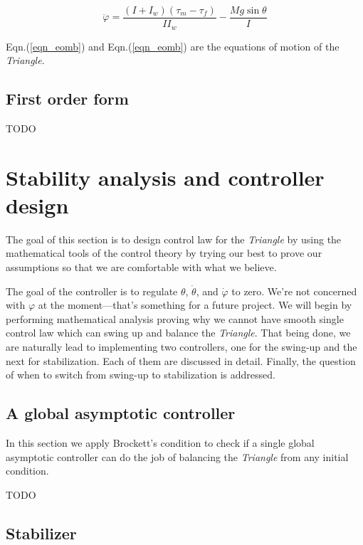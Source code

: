 \documentclass{article}
\begin{document}
\begin{equation}
  \label{eqn_eomw}
  \ddot{\varphi} = \dfrac{(I + I_w)(\tau_m - \tau_f)}{I I_w} - \dfrac{M g \sin\theta}{I}
\end{equation}

Eqn.(\ref{eqn_eomb}) and Eqn.(\ref{eqn_eomb}) are the equations of motion of the \textit{Triangle}.

\subsection{First order form}
\begin{center}
  TODO
\end{center}

\newpage
\section{Stability analysis and controller design}

The goal of this section is to design control law for the \textit{Triangle} by using the mathematical tools of the control theory by trying our best to prove our assumptions so that we are comfortable with what we believe.

The goal of the controller is to regulate $\theta$,  $\dot{\theta}$, and $\dot{\varphi}$ to zero. We're not concerned with $\varphi$ at the moment—that's something for a future project. We will begin by performing mathematical analysis proving why we cannot have smooth single control law which can swing up and balance the \textit{Triangle}. That being done, we are naturally lead to implementing two controllers, one for the swing-up and the next for stabilization. Each of them are discussed in detail. Finally, the question of when to switch from swing-up to stabilization is addressed.

\subsection{A global asymptotic controller}

In this section we apply Brockett's condition to check if a single global asymptotic controller can do the job of balancing the \textit{Triangle} from any initial condition.
\begin{center}
  TODO
\end{center}

\subsection{Stabilizer}
\end{document}

